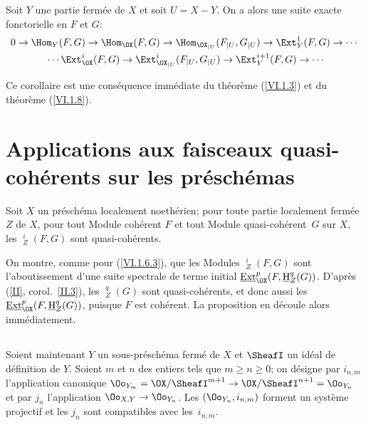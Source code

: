 \begin{corollaire} \label{VI.1.9} Soit $Y$ une partie ferm\'ee de $X$ et soit $U=X{-} Y$. On a alors une suite exacte fonctorielle en $F$ et $G$:
\begin{gather*}
0 \to \Hom_Y(F, G) \to \Hom_{\OX}(F, G) \to \Hom_{{\OX}_{|U}}(F_{|U}, G_{|U}) \to \Ext_{Y}^1(F, G) \to \cdots{}\\
{}\cdots \Ext_{{\OX}}^i(F, G) \to \Ext_{{{\OX}_{|U}}}^i(F_{|U}, G_{|U}) \to \Ext_{Y}^{i+1}(F, G) \to \cdots
\end{gather*}
\end{corollaire}

Ce corollaire est une cons\'equence imm\'ediate du th\'eor\`eme (\ref{VI.1.3}) et du th\'eor\`eme (\ref{VI.1.8}).

\section{Applications aux faisceaux quasi-coh\'erents sur les pr\'esch\'emas} \label{VI.2}

\begin{proposition} \label{VI.2.1}
Soit $X$ un pr\'esch\'ema localement noeth\'erien; pour toute partie localement ferm\'ee $Z$ de $X$, pour tout Module coh\'erent $F$ et tout Module quasi-coh\'erent~$G$ sur $X$, les $\mathop{\underline{\mathrm{Ext}}}\nolimits_Z^i(F, G)$ sont quasi-coh\'erents.
\end{proposition}

On montre, comme pour (\ref{VI.1.6.3}), que les Modules $\mathop{\underline{\mathrm{Ext}}}\nolimits_Z^i(F, G)$ sont l'aboutissement d'une suite spectrale de terme initial $\mathop{\underline{\mathrm{Ext}}}\nolimits_{\OX}^p(F, \mathop{\underline{\mathrm{H}}}\nolimits_Z^q (G))$. D'apr\`es (\ref{II}, corol.\, \ref{II.3}), les $\mathop{\underline{\mathrm{H}}}\nolimits_Z^q(G)$ sont quasi-coh\'erents, et donc aussi les $\mathop{\underline{\mathrm{Ext}}}\nolimits_{\OX}^p (F, \mathop{\underline{\mathrm{H}}}\nolimits_Z^q (G))$, puisque $F$ est coh\'erent. La proposition en d\'ecoule alors imm\'ediatement.

\begin{empty} \label{VI.2.2}
\end{empty}

\subsection{} Soient maintenant $Y$ un sous-pr\'esch\'ema ferm\'e de $X$ et $\SheafI$ un id\'eal de d\'efinition de $Y$. Soient $m$ et $n$ des entiers tels que $m\geq n \geq 0$; on d\'esigne par $i_{n, m}$ l'application canonique $\Oo_{Y_m} = \OX/\SheafI^{m+1} \to \OX/\SheafI^{n+1} = \Oo_{Y_n}$ et par $j_n$ l'application \hbox{$\Oo_{X, Y}\to \Oo_{Y_n}$}. Les $(\Oo_{Y_n}, i_{n, m})$ forment un syst\`eme projectif et les $j_n$ sont compatibles avec les~$i_{n, m}$.

